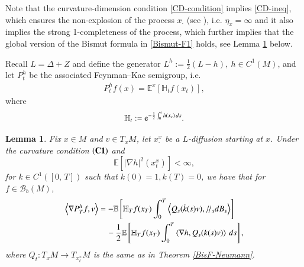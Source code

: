 \documentclass[11pt,twoside, reqno]{article}
\def\r{\right}
\def\lf{\left}
\def\ptr {/\!/}
\def\e{{\rm e}}
\newcommand\1{\mathbbm{1}}
\newcommand\E{\mathbb{E}}
\newtheorem{lemma}[theorem]{Lemma}
\theoremstyle{definition}
\numberwithin{equation}{section}
\def \e{{\rm e}}
\begin{document}
Note that the curvature-dimension condition \eqref{CD-condition} implies \eqref{CD-ineq}, which  ensures the non-explosion of the
process $x_{\cdot}$ (see \cite[Theorem 2.1.1]{Wbook14}), i.e. $\eta_x=\infty$ and it also implies the strong 1-completeness of the process, which further implies that  the global version of the Bismut formula in \eqref{Bismut-F1} holds, see Lemma \ref{lem} below.


Recall $L=\Delta+Z$ and  define  the generator $L^h:=\frac{1}{2}(L-h), \ h \in C^1(M)$, and let $P_t^h$ be the associated Feynman--Kac semigroup, i.e. 
\begin{align*}
P_t^hf(x)=\E^x\lf[\mathbb{H}_t f(x_t)\r],
\end{align*}
where 
\begin{equation}
    \mathbb{H}_t:=\e^{-\frac{1}{2}\int_0^th(x_s)\, ds}.
\end{equation}
\begin{lemma}\label{lem}
   Fix  $x\in M$ and $v\in T_xM$, let $x_{\cdot}^x$ be a $L$-diffusion starting at $x$.  Under the curvature condition $(\bf C1)$ and 
   $$  \mathbb{E}[|\nabla h|^2(x_t^x)]<\infty,$$
  for  $k\in C^1([0,\, T])$ such that $ k(0)=1, k(T)=0$, we have that for $f\in \mathcal{B}_b(M)$,
\begin{equation}\label{s1.fy.bis.loc}
\aligned
    \Braket{\nabla P_T^hf, v}&=-\mathbb{E}\lf[\mathbb{H}_Tf(x_T)\int_0^T\Braket{Q_s(\dot{k}(s)v), \ptr_sdB_s}\r]\\
    &\quad -\frac{1}{2}\mathbb{E}\lf[\mathbb{H}_Tf(x_T)\int_0^T\Braket{\nabla h , Q_s(k(s)v)}\, ds\r],
\endaligned
\end{equation}
where \( Q_t : T_xM \to T_{x_t^x}M \) is the same as in Theorem \ref{BisF-Neumann}.
\end{lemma}
\end{document}
